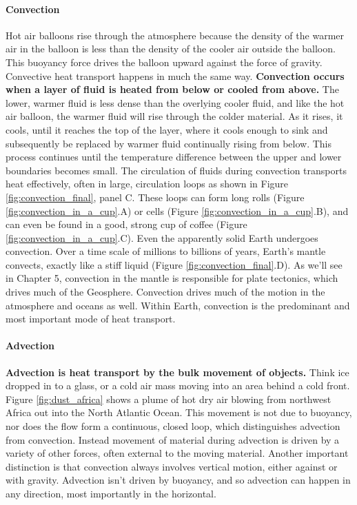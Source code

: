 \documentclass[amstex,12pt]{book}
\begin{document}
\paragraph{Convection}
Hot air balloons rise through the atmosphere because the density of the warmer air in the balloon is less than the density of the cooler air outside the balloon. This buoyancy force drives the balloon upward against the force of gravity. Convective heat transport happens in much the same way. \textbf{Convection occurs when a layer of fluid is heated from below or cooled from above.} The lower, warmer fluid is less dense than the overlying cooler fluid, and like the hot air balloon, the warmer fluid will rise through the colder material. As it rises, it cools, until it reaches the top of the layer, where it cools enough to sink and subsequently be replaced by warmer fluid continually rising from below. This process continues until the temperature difference between the upper and lower boundaries becomes small. The circulation of fluids during convection transports heat effectively, often in large, circulation loops as shown in Figure \ref{fig:convection_final}, panel C. These loops can form long rolls (Figure \ref{fig:convection_in_a_cup}.A) or cells (Figure \ref{fig:convection_in_a_cup}.B), and can even be found in a good, strong cup of coffee (Figure \ref{fig:convection_in_a_cup}.C). Even the apparently solid Earth undergoes convection. Over a time scale of millions to billions of years, Earth's mantle convects, exactly like a stiff liquid (Figure \ref{fig:convection_final}.D). As we'll see in Chapter 5, convection in the mantle is responsible for plate tectonics, which drives much of the Geosphere. Convection drives much of the motion in the atmosphere and oceans as well. Within Earth, convection is the predominant and most important mode of heat transport.

\paragraph{Advection}
\textbf{Advection is heat transport by the bulk movement of objects.} Think ice dropped in to a glass, or a cold air mass moving into an area behind a cold front. Figure \ref{fig:dust_africa} shows a plume of hot dry air blowing from northwest Africa out into the North Atlantic Ocean. This movement is not due to buoyancy, nor does the flow form a continuous, closed loop, which distinguishes advection from convection. Instead movement of material during advection is driven by a variety of other forces, often external to the moving material. Another important distinction is that convection always involves vertical motion, either against or with gravity. Advection isn't driven by buoyancy, and so advection can happen in any direction, most importantly in the horizontal.
\end{document}
